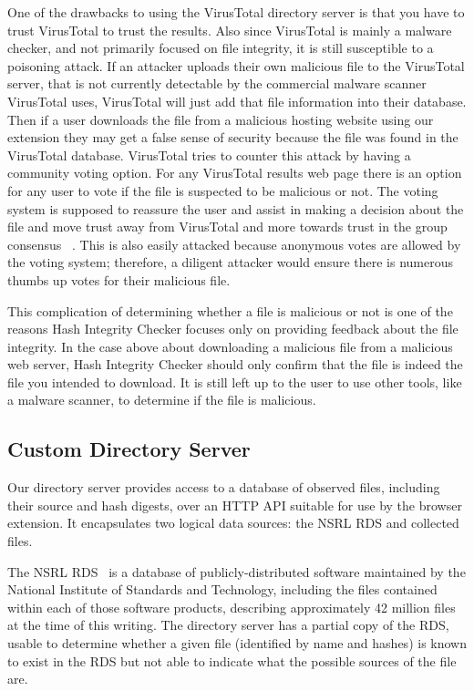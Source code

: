 \documentclass[letterpaper,twocolumn,10pt]{article}
\begin{document}
One of the drawbacks to using the VirusTotal directory server is that you have to trust VirusTotal to trust the results. Also since VirusTotal is mainly a malware checker, and not primarily focused on file integrity, it is still susceptible to a poisoning attack. If an attacker uploads their own malicious file to the VirusTotal server, that is not currently detectable by the commercial malware scanner VirusTotal uses, VirusTotal will just add that file information into their database. Then if a user downloads the file from a malicious hosting website using our extension they may get a false sense of security because the file was found in the VirusTotal database. VirusTotal tries to counter this attack by having a community voting option. For any VirusTotal results web page there is an option for any user to vote if the file is suspected to be malicious or not. The voting system is supposed to reassure the user and assist in making a decision about the file and move trust away from VirusTotal and more towards trust in the group consensus ~\cite{GroupPolarization}. This is also easily attacked because anonymous votes are allowed by the voting system; therefore, a diligent attacker would ensure there is numerous thumbs up votes for their malicious file.

This complication of determining whether a file is malicious or not is one of the reasons Hash Integrity Checker focuses only on providing feedback about the file integrity. In the case above about downloading a malicious file from a malicious web server, Hash Integrity Checker should only confirm that the file is indeed the file you intended to download. It is still left up to the user to use other tools, like a malware scanner, to determine if the file is malicious.

\subsection{Custom Directory Server}

Our directory server provides access to a database of observed files, including their
source and hash digests, over an HTTP API suitable for use by the browser extension.
It encapsulates two logical data sources: the NSRL RDS and collected files.

The NSRL RDS~\cite{nsrl-rds} is a database of publicly-distributed software maintained by the
National Institute of Standards and Technology, including the files contained within each
of those software products, describing approximately 42 million files at the time of this
writing. The directory server has a partial copy of the RDS, usable to determine
whether a given file (identified by name and hashes) is known to exist in the RDS
but not able to indicate what the possible sources of the file are.
\end{document}
